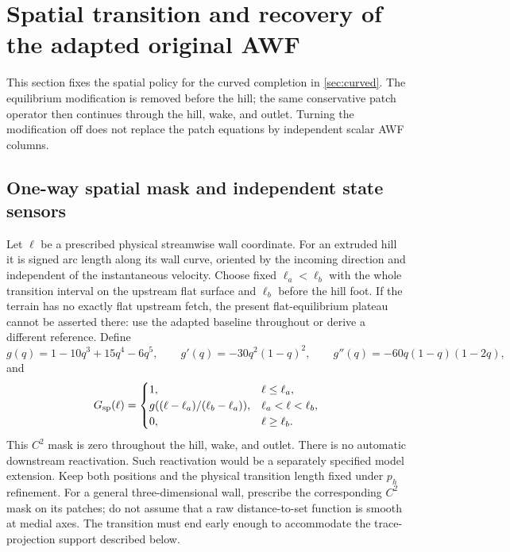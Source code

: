 \documentclass[11pt,a4paper]{article}
\numberwithin{equation}{section}
\begin{document}
\section{Spatial transition and recovery of the adapted original AWF}
\label{sec:transition}
This section fixes the spatial policy for the curved completion in
\cref{sec:curved}. The equilibrium modification is removed before the
hill; the same conservative patch operator then continues through the
hill, wake, and outlet. Turning the modification off does not replace
the patch equations by independent scalar AWF columns.

\subsection{One-way spatial mask and independent state sensors}
Let $\ell$ be a prescribed physical streamwise wall coordinate. For an
extruded hill it is signed arc length along its wall curve, oriented by
the incoming direction and independent of the instantaneous velocity.
Choose fixed $\ell_a<\ell_b$ with the whole transition interval on
the upstream flat surface and $\ell_b$ before the hill foot. If the
terrain has no exactly flat upstream fetch, the present flat-equilibrium
plateau cannot be asserted there: use the adapted baseline throughout
or derive a different reference. Define
\begin{equation}
 g(q)=1-10q^3+15q^4-6q^5,\qquad
 g'(q)=-30q^2(1-q)^2,\qquad
 g''(q)=-60q(1-q)(1-2q),
 \label{eq:transition-polynomial}
\end{equation}
and
\begin{equation}
 G_{\rm sp}(\ell)=
 \begin{cases}
 1,&\ell\le\ell_a,\\
 g((\ell-\ell_a)/(\ell_b-\ell_a)),&\ell_a<\ell<\ell_b,\\
 0,&\ell\ge\ell_b.
 \end{cases}
 \label{eq:transition-spatial}
\end{equation}
This $C^2$ mask is zero throughout the hill, wake, and outlet. There
is no automatic downstream reactivation. Such reactivation would be
a separately specified model extension. Keep both positions and the
physical transition length fixed under $p_h$ refinement. For a general
three-dimensional wall, prescribe the corresponding $C^2$ mask on its
patches; do not assume that a raw distance-to-set function is smooth
at medial axes. The transition must end early enough to accommodate
the trace-projection support described below.
\end{document}
